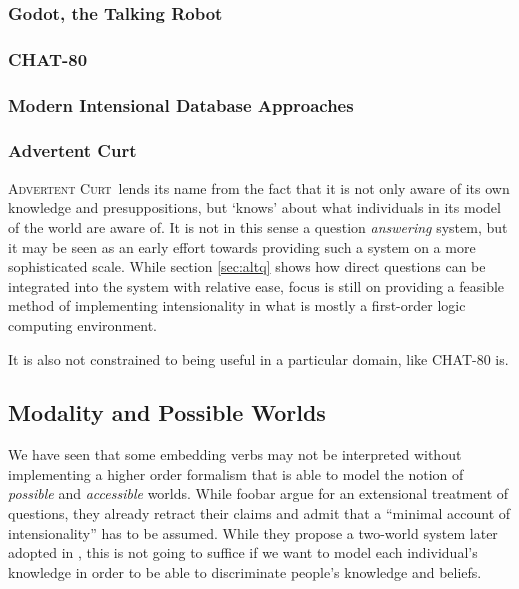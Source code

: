 \documentclass[a4paper,fontsize=12pt]{article}
\newcommand{\pn}{\textsc} %
\newcommand{\acurt}{\pn{Advertent Curt}\mbox{ }}
\theoremstyle{remark} \newtheorem*{termin}{Definition} %
\begin{document}
\subsubsection{Godot, the Talking Robot}

\subsubsection{CHAT-80}

\subsubsection{Modern Intensional Database Approaches}

\subsubsection{Advertent Curt}

\acurt lends its name from the fact that it is not only aware of its own
knowledge and presuppositions, but `knows' about what individuals in its
model of the world are aware of. It is not in this sense a question
\emph{answering} system, but it may be seen as an early effort towards providing
such a system on a more sophisticated scale. While section \ref{sec:altq} shows
how direct questions can be integrated into the system with relative ease, focus
is still on providing a feasible method of implementing intensionality in what
is mostly a first-order logic computing environment.

It is also not constrained to being useful in a particular domain, like
\pn{CHAT-80} is.

\subsection{Modality and Possible Worlds}
\label{sec:indices}

We have seen that some embedding verbs may not be interpreted without
implementing a higher order formalism that is able to model the notion of
\emph{possible} and \emph{accessible} worlds. While foobar %
argue for an extensional treatment of questions, they already %
retract their claims and admit that a ``minimal account of intensionality'' has
to be assumed. While they propose a two-world system later adopted in
\cite{g:is}, this is not going to suffice if we want to model each individual's
knowledge in order to be able to discriminate people's knowledge and beliefs.
\end{document}

